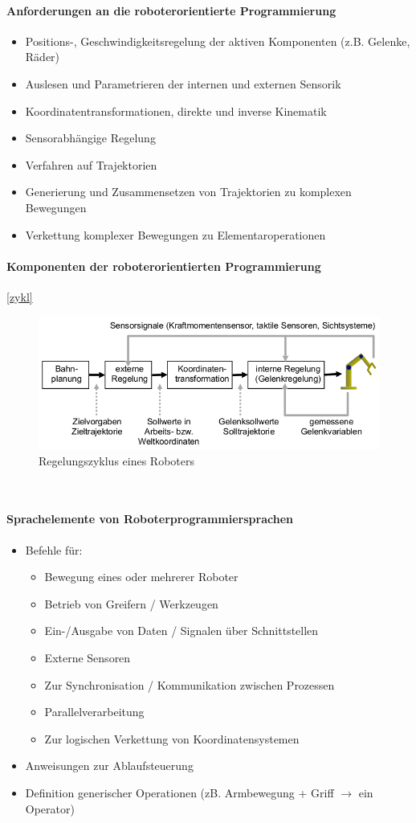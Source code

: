 \paragraph{Anforderungen an die roboterorientierte Programmierung}
\begin{itemize}
\item Positions-, Geschwindigkeitsregelung der aktiven Komponenten (z.B. Gelenke, Räder)
\item Auslesen und Parametrieren der internen und externen Sensorik
\item Koordinatentransformationen, direkte und inverse Kinematik
\item Sensorabhängige Regelung
\item Verfahren auf Trajektorien
\item Generierung und Zusammensetzen von Trajektorien zu komplexen Bewegungen
\item Verkettung komplexer Bewegungen zu Elementaroperationen
\end{itemize}
\paragraph{Komponenten der roboterorientierten Programmierung}
\autoref{zykl}\\
\begin{figure}[h!]\centering 
\includegraphics[width=0.7\linewidth]{figures/ch01_zykl.png}
\caption{Regelungszyklus eines Roboters}
\label{zykl}
\end{figure}\\
\paragraph{Sprachelemente von Roboterprogrammiersprachen}
\begin{itemize}
\item Befehle für:
\begin{itemize}
\item Bewegung eines oder mehrerer Roboter
\item Betrieb von Greifern / Werkzeugen
\item Ein-/Ausgabe von Daten / Signalen über Schnittstellen
\item Externe Sensoren
\item Zur Synchronisation / Kommunikation zwischen Prozessen
\item Parallelverarbeitung
\item Zur logischen Verkettung von Koordinatensystemen
\end{itemize}
\item Anweisungen zur Ablaufsteuerung
\item Definition generischer Operationen (zB. Armbewegung + Griff $\rightarrow$ ein Operator)
\end{itemize}
